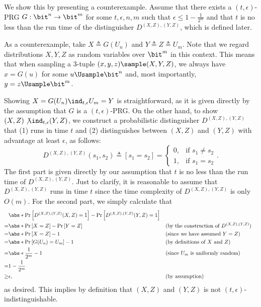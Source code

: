 \begin{answer}[c]
    We show this by presenting a counterexample.
    Assume that there exists a $(t,\epsilon)$-PRG $G:\bit^n\to \bit^m$ for some $t,\epsilon,n,m$ such that $\epsilon \le 1-\frac{1}{2^m}$ and that $t$ is no less than the run time of the distinguisher $D^{(X,Z),(Y,Z)}$, which is defined later.
    
    As a counterexample, take $X\triangleq G(U_n)$ and $Y\triangleq Z\triangleq U_m$. Note that we regard distributions $X,Y,Z$ as random variables over $\bit^m$ in this context. This means that when sampling a 3-tuple $(x,y,z)\sample (X,Y,Z)$, we always have $x=G(u)$ for some $u\Usample \bit^n$ and, most importantly, $y=z\Usample \bit^m$.
    
    Showing $X=G(U_n)\ind_{t,\epsilon} U_m=Y$ is straightforward, as it is given directly by the assumption that $G$ is a $(t,\epsilon)$-PRG. On the other hand, to show $(X,Z)\not\ind_{t,\epsilon} (Y,Z)$, we construct a probabilistic distinguisher $D^{(X,Z),(Y,Z)}$  that (1) runs in time $t$ and (2) distinguishes between $(X,Z)$ and $(Y,Z)$ with advantage at least $\epsilon$, as follows:
    \[
        D^{(X,Z),(Y,Z)}(s_1,s_2)\triangleq [s_1=s_2]=\begin{cases}
            0, & \textrm{if } s_1\neq s_2\\
            1, & \textrm{if } s_1=s_2
        \end{cases}.
    \]
    The first part is given directly by our assumption that $t$ is no less than the run time of $D^{(X,Z),(Y,Z)}$. Just to clarify, it is reasonable to assume that $D^{(X,Z),(Y,Z)}$ runs in time $t$  since the time complexity of $D^{(X,Z),(Y,Z)}$ is only $O(m)$. For the second part, we simply calculate that
    \begin{align*}
        &\abs*{\Pr\left[D^{(X,Z),(Y,Z)}(X,Z)=1\right] - \Pr\left[D^{(X,Z),(Y,Z)}(Y,Z)=1\right]}\\
        =&\abs*{\Pr\left[X=Z\right] - \Pr\left[ Y=Z \right]}
        &&(\textrm{by the construction of $D^{(X,Z),(Y,Z)}$})\\
        =&\abs*{\Pr\left[X=Z\right] - 1}
        &&(\textrm{since we have assumed $Y=Z$})\\
        =&\abs*{\Pr\left[G(U_n)=U_m\right] - 1}
        &&(\textrm{by definitions of $X$ and $Z$})\\
        =&\abs*{\frac{1}{2^m} - 1}
        &&(\textrm{since $U_m$ is uniformly random})\\
        =& 1 - \frac{1}{2^m} \\
        \ge& \epsilon,
        &&(\textrm{by assumption})
    \end{align*}
    as desired. This implies by definition that $(X,Z)$ and $(Y,Z)$ is not $(t,\epsilon)$-indistinguishable.
\end{answer}